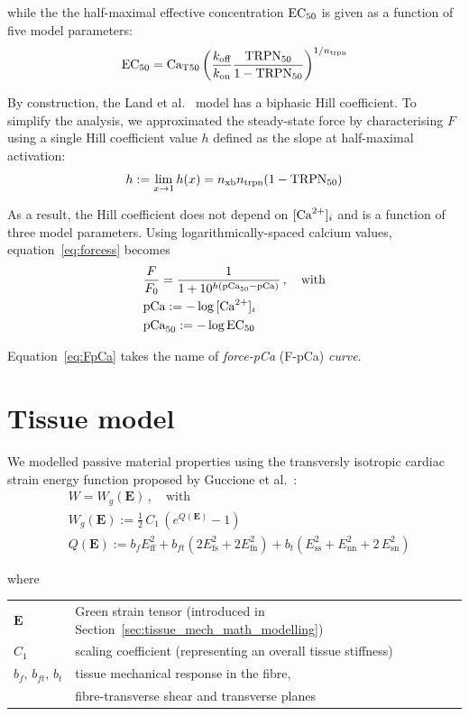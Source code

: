 \noindent
while the the half-maximal effective concentration $\textrm{EC}_{50}$ is given as a function of five model parameters:
%
\begin{equation}\label{eq:ec50}
    \textrm{EC}_{50} = \textrm{Ca}_{\textrm{T}50}\left(\frac{k_{\textrm{off}}}{k_{\textrm{on}}}\frac{\textrm{TRPN}_{50}}{1-\textrm{TRPN}_{50}}\right)^{1/n_{\textrm{trpn}}}
\end{equation}

By construction, the Land et al.~\cite{Land:2012} model has a biphasic Hill coefficient. To simplify the analysis, we approximated the steady-state force by characterising $F$ using a single Hill coefficient value $h$ defined as the slope at half-maximal activation:
%
\begin{equation}\label{eq:h}
    h := \lim_{x\to1}h(x) = n_{\textrm{xb}}n_{\textrm{trpn}}(1-\textrm{TRPN}_{50})
\end{equation}

\noindent
As a result, the Hill coefficient does not depend on $[\textrm{Ca}^{2+}]_{i}$ and is a function of three model parameters. Using logarithmically-spaced calcium values, equation~\eqref{eq:forcess} becomes
%
\begin{align}\label{eq:FpCa}
    & \frac{F}{F_0} = \frac{1}{1+10^{h(\textrm{pCa}_{50}-\textrm{pCa})}}\,,\quad\text{with} \\
    & \textrm{pCa}:=-\log{[\textrm{Ca}^{2+}]_{i}} \\
    & \textrm{pCa}_{50}:=-\log{\textrm{EC}_{50}}
\end{align}

\noindent
Equation~\eqref{eq:FpCa} takes the name of \textit{force-pCa} (\acs{F-pCa}) \textit{curve}.


%
%
%
\section{Tissue model}\label{sec:tissuemodel}
We modelled passive material properties using the transversly isotropic cardiac strain energy function proposed by Guccione et al.~\cite{Guccione:1991}:
%
\begin{align}\label{eq:guccstrainenergy}
    &W = W_g(\mathbf{E})\,,\quad\text{with} \\
    &W_g(\mathbf{E}) := \frac{1}{2}\,C_1\,(e^{Q(\mathbf{E})}-1) \\
    &Q(\mathbf{E}) := b_f E_{\text{ff}}^2 + b_{ft}(2E_{\text{fs}}^2+2E_{\text{fn}}^2) + b_t(E_{\text{ss}}^2+E_{\text{nn}}^2+2\,E_{\text{sn}}^2)
\end{align}

\noindent
where

\vspace{0.2cm}
\begin{tabular}{ll}
    $\mathbf{E}$ & Green strain tensor (introduced in Section~\ref{sec:tissue_mech_math_modelling}) \\
    $C_1$ & scaling coefficient (representing an overall tissue stiffness) \\
    $b_f,\,b_{ft},\,b_t$ & tissue mechanical response in the fibre, \\ & fibre-transverse shear and transverse planes \\
\end{tabular}

